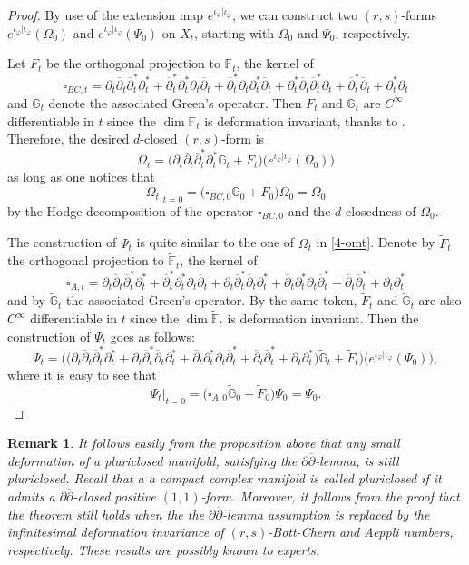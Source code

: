 \documentclass[12pt]{amsart}
\numberwithin{equation}{section}
\newtheorem{remark}  [theorem]     {Remark}
\renewcommand{\1}{\mathds{1}}
\newcommand{\G}{\mathbb{G}}
\newcommand{\db}{\overline{\partial}}
\renewcommand{\>}{\rightarrow}
\newcommand{\p}{\partial}
\def\p{\partial}
\def\o{\overline}
\begin{document}
\begin{proof}
By use of the extension map
$e^{\iota_{\varphi}|\iota_{\o{\varphi}}}$, we can construct two
$(r,s)$-forms $e^{\iota_{\varphi}|\iota_{\o{\varphi}}}(\Omega_0)$
and $e^{\iota_{\varphi}|\iota_{\o{\varphi}}}(\Psi_0)$ on $X_t$,
starting with $\Omega_0$ and $\Psi_0$, respectively.

Let $F_t$ be the orthogonal projection to $\mathds{F}_t$, the kernel
of
$$\square_{{BC},t}=\p_t\db_t\db_t^*\p_t^*+\db_t^*\p_t^*\p_t\db_t+\db_t^*\p_t\p_t^*\db_t+\p_t^*\db_t\db_t^*\p_t+\db_t^*\db_t+\p_t^*\p_t$$
and $\G_t$ denote the associated Green's operator. Then $F_t$ and
$\G_t$ are $C^{\infty}$ differentiable in $t$ since the $\dim
\mathds{F}_t$ is deformation invariant, thanks to \cite[Theorem
5.12]{w}. Therefore, the desired $d$-closed $(r,s)$-form is
\begin{equation}\label{4-omt}
\Omega_t =\big(\p_t\db_t\db_t^*\p_t^*\G_t+F_t\big)\big(e^{\iota_{\varphi}|\iota_{\o{\varphi}}}(\Omega_0)\big)
\end{equation}
as long as one notices that
$$\left.\Omega_t\right|_{t=0} =\big(\square_{{BC},0}\G_0+F_0\big)\Omega_0=\Omega_0$$
by the Hodge decomposition of the operator $\square_{{BC},0}$ and
the $d$-closedness of $\Omega_0$.

The construction of $\Psi_t$ is quite similar to the one of
$\Omega_t$ in \eqref{4-omt}. Denote by $\widetilde{F}_t$ the orthogonal
projection to $\widetilde{\mathds{F}}_t$, the kernel of
\[ \square_{A,t}= \p_t\db_t\db_t^*\p_t^*+\db_t^*\p_t^*\p_t\db_t
+\p_t\db_t^*\db_t\p_t^*+\db_t\p_t^*\p_t\db_t^*+\db_t\db_t^*+\p_t\p_t^*
\] and by $\widetilde{\mathbb{G}}_t$ the associated Green's
operator. By the same token, $\widetilde{F}_t$ and
$\widetilde{\mathbb{G}}_t$ are also $C^{\infty}$ differentiable in
$t$ since the $\dim \widetilde{\mathds{F}}_t$ is deformation
invariant. Then the construction of $\Psi_t$ goes as follows:
\[ \Psi_t =\Big(\big(\p_t\db_t\db_t^*\p_t^*+\p_t\db_t^*\db_t\p_t^*+
\db_t\p_t^*\p_t\db_t^*+\db_t\db_t^*+\p_t\p_t^*\big)\widetilde{\G}_t+\widetilde{F}_t\Big)
\Big(e^{\iota_{\varphi}|\iota_{\o{\varphi}}}(\Psi_0)\Big), \] where
it is easy to see that
\[ \left.\Psi_t\right|_{t=0}= \big( \square_{A,0}\widetilde{\mathbb{G}}_0 + \widetilde{F}_0 \big) \Psi_0 = \Psi_0. \]
\end{proof}


\begin{remark}\label{d-ext-rem}
It follows easily from the proposition above that any small deformation
of a pluriclosed manifold, satisfying the $\p\db$-lemma, is still
pluriclosed. Recall that a a compact complex manifold is called
\emph{pluriclosed} if it admits a $\p\db$-closed positive $(1,1)$-form.
Moreover, it follows from the proof that the theorem still holds
when the the $\p\db$-lemma assumption is replaced by the
infinitesimal  deformation invariance of $(r,s)$-Bott-Chern and
Aeppli numbers, respectively. These results are possibly known to experts.
\end{remark}
\end{document}
